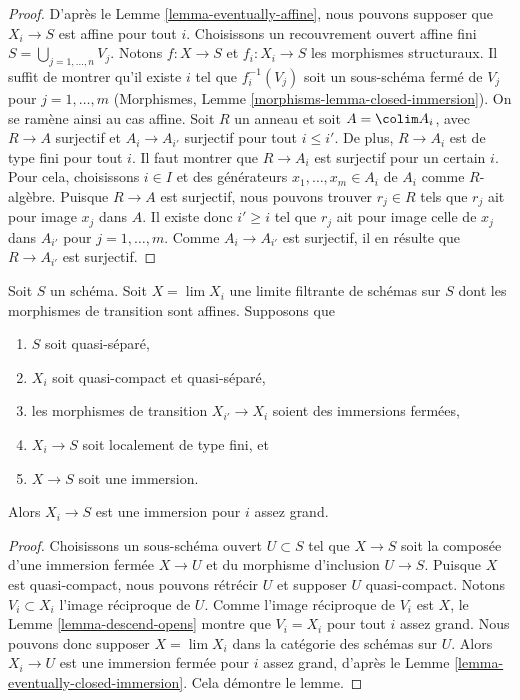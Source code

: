 \begin{proof}
D'après le Lemme \ref{lemma-eventually-affine}, nous pouvons supposer que
$X_i \to S$ est affine pour tout $i$. Choisissons un recouvrement ouvert
affine fini $S = \bigcup_{j = 1, \ldots, n} V_j$. Notons $f : X \to S$ et
$f_i : X_i \to S$ les morphismes structuraux. Il suffit de montrer qu'il
existe $i$ tel que $f_i^{-1}(V_j)$ soit un sous-schéma fermé de $V_j$ pour
$j = 1, \ldots, m$ (Morphismes,
Lemme \ref{morphisms-lemma-closed-immersion}). On se ramène ainsi au cas
affine. Soit $R$ un anneau et soit $A = \colim A_i$, avec $R \to A$
surjectif et $A_i \to A_{i'}$ surjectif pour tout $i \leq i'$. De plus,
$R \to A_i$ est de type fini pour tout $i$. Il faut montrer que
$R \to A_i$ est surjectif pour un certain $i$. Pour cela, choisissons
$i \in I$ et des générateurs $x_1, \ldots, x_m \in A_i$ de $A_i$ comme
$R$-algèbre. Puisque $R \to A$ est surjectif, nous pouvons trouver
$r_j \in R$ tels que $r_j$ ait pour image $x_j$ dans $A$. Il existe donc $i' \geq i$ tel
que $r_j$ ait pour image celle de $x_j$ dans $A_{i'}$ pour
$j = 1, \ldots, m$. Comme $A_i \to A_{i'}$ est surjectif, il en résulte que
$R \to A_{i'}$ est surjectif.
\end{proof}

\begin{lemma}
\label{lemma-eventually-immersion}
Soit $S$ un schéma. Soit $X = \lim X_i$ une limite filtrante de schémas sur
$S$ dont les morphismes de transition sont affines. Supposons que
\begin{enumerate}
\item $S$ soit quasi-séparé,
\item $X_i$ soit quasi-compact et quasi-séparé,
\item les morphismes de transition $X_{i'} \to X_i$ soient des immersions
fermées,
\item $X_i \to S$ soit localement de type fini, et
\item $X \to S$ soit une immersion.
\end{enumerate}
Alors $X_i \to S$ est une immersion pour $i$ assez grand.
\end{lemma}

\begin{proof}
Choisissons un sous-schéma ouvert $U \subset S$ tel que $X \to S$ soit la
composée d'une immersion fermée $X \to U$ et du morphisme d'inclusion
$U \to S$. Puisque $X$ est quasi-compact, nous pouvons rétrécir $U$ et
supposer $U$ quasi-compact. Notons $V_i \subset X_i$ l'image réciproque de $U$.
Comme l'image réciproque de $V_i$ est $X$, le
Lemme \ref{lemma-descend-opens} montre que $V_i = X_i$ pour tout $i$ assez
grand. Nous pouvons donc supposer $X = \lim X_i$ dans la catégorie des
schémas sur $U$. Alors $X_i \to U$ est une immersion fermée pour $i$ assez grand,
d'après le Lemme \ref{lemma-eventually-closed-immersion}. Cela
démontre le lemme.
\end{proof}











